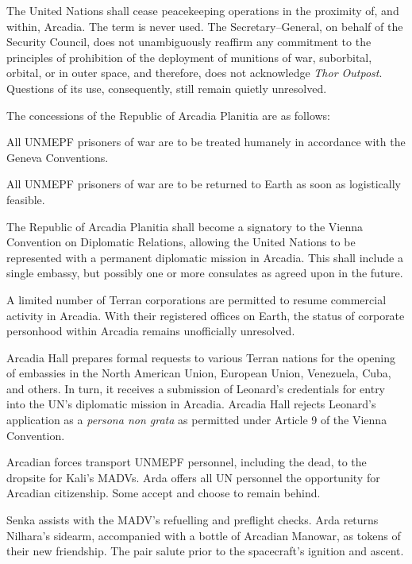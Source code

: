 \item The United Nations shall cease peacekeeping operations in the proximity of, and within, Arcadia. The term  is never used. The Secretary--General, on behalf of the Security Council, does not unambiguously reaffirm any commitment to the principles of prohibition of the deployment of munitions of war, suborbital, orbital, or in outer space, and therefore, does not acknowledge {\it Thor Outpost}. Questions of its use, consequently, still remain quietly unresolved.
\stopitemize

The concessions of the Republic of Arcadia Planitia are as follows:

\startitemize[R]
\item All UNMEPF prisoners of war are to be treated humanely in accordance with the Geneva Conventions.

\item All UNMEPF prisoners of war are to be returned to Earth as soon as logistically feasible.

\item The Republic of Arcadia Planitia shall become a signatory to the Vienna Convention on Diplomatic Relations, allowing the United Nations to be represented with a permanent diplomatic mission in Arcadia. This shall include a single embassy, but possibly one or more consulates as agreed upon in the future.

\item A limited number of Terran corporations are permitted to resume commercial activity in Arcadia. With their registered offices on Earth, the status of corporate personhood within Arcadia remains unofficially unresolved.
\stopitemize

Arcadia Hall prepares formal requests to various Terran nations for the opening of embassies in the North American Union, European Union, Venezuela, Cuba, and others. In turn, it receives a submission of Leonard's credentials for entry into the UN's diplomatic mission in Arcadia. Arcadia Hall rejects Leonard's application as a {\it persona non grata} as permitted under Article 9 of the Vienna Convention.
\StopTimelineDate

Arcadian forces transport UNMEPF personnel, including the dead, to the dropsite for Kali's MADVs. Arda offers all UN personnel the opportunity for Arcadian citizenship. Some accept and choose to remain behind. 

Senka assists with the MADV's refuelling and preflight checks. Arda returns Nilhara's sidearm, accompanied with a bottle of Arcadian Manowar, as tokens of their new friendship. The pair salute prior to the spacecraft's ignition and ascent.
\StopTimelineDate

